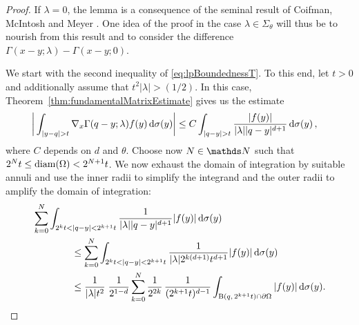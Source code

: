 \begin{proof}
  If $\lambda = 0$, the lemma is a consequence of the seminal result of Coifman, McIntosh and Meyer \cite[Thm.\@9]{coifman}.
  One idea of the proof in the case $\lambda \in \Sigma_\theta$ will thus be to nourish from this result and to consider the difference $\Gamma(x - y; \lambda) - \Gamma(x - y; 0)$.

  We start with the second inequality of \eqref{eq:lpBoundednessT}.
  To this end, let $t > 0$ and additionally assume that $t^2 |\lambda| > ({1}/{2})$. 
  In this case, Theorem~\ref{thm:fundamentalMatrixEstimate} gives us the estimate
  \begin{align*}
    \bigg| \int_{|y - q| > t} \nabla_x \Gamma(q - y; \lambda) f(y) \, {\operatorname{d}\!{\sigma}}(y) \bigg|
    &\leq C \int_{|q - y| > t} \frac{|f(y)|}{|\lambda| |q - y|^{d + 1}} \, {\operatorname{d}\!{\sigma}}(y) \,,
  \end{align*}
  where $C$ depends on $d$ and $\theta$.
  Choose now $N \in \N$ such that $2^N t \leq \operatorname{diam}(\Omega) < 2^{N + 1} t$.
  We now exhaust the domain of integration by suitable annuli and use the inner radii to simplify the integrand and the outer radii to amplify the domain of integration:
  \begin{align}
    &\sum_{k = 0}^N \int_{2^k t < |q - y| < 2^{k + 1}t}  \frac{1}{|\lambda| |q - y|^{d + 1}} |f(y)| \d \sigma(y) \nonumber\\
    &\qquad\qquad\leq \sum_{k = 0}^N \int_{2^k t < |q - y| < 2^{k + 1}t}  \frac{1}{|\lambda| 2^{k(d + 1)}t^{d + 1}} |f(y)| \d \sigma(y) \nonumber\\
    &\qquad\qquad\leq \frac{1}{|\lambda|t^2}\; \frac{1}{2^{1 -d}}\sum_{k = 0}^N \frac{1}{2^{2k}}\, \frac{1}{(2^{k+1} t)^{d - 1}} \int_{\BB(q,\, 2^{k + 1}t) \cap \partial \Omega}  |f(y)| \d\sigma(y)\label{eq:gtt}.

\end{align}
\end{proof}
